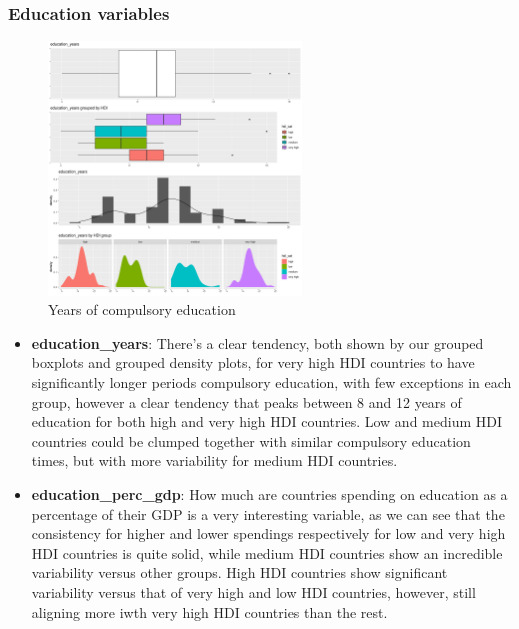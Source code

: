 \documentclass[]{article}
\providecommand{\tightlist}{%
  \setlength{\itemsep}{0pt}\setlength{\parskip}{0pt}}
\begin{document}
\hypertarget{education-variables}{%
\subsubsection{Education variables}\label{education-variables}}

\begin{figure}
\centering
\includegraphics[width=0.6\textwidth,height=\textheight]{./img/education_years.png}
\caption{Years of compulsory education}
\end{figure}

\begin{itemize}
\tightlist
\item
  \textbf{education\_years}: There's a clear tendency, both shown by our
  grouped boxplots and grouped density plots, for very high HDI
  countries to have significantly longer periods compulsory education,
  with few exceptions in each group, however a clear tendency that peaks
  between 8 and 12 years of education for both high and very high HDI
  countries. Low and medium HDI countries could be clumped together with
  similar compulsory education times, but with more variability for
  medium HDI countries.
\item
  \textbf{education\_perc\_gdp}: How much are countries spending on
  education as a percentage of their GDP is a very interesting variable,
  as we can see that the consistency for higher and lower spendings
  respectively for low and very high HDI countries is quite solid, while
  medium HDI countries show an incredible variability versus other
  groups. High HDI countries show significant variability versus that of
  very high and low HDI countries, however, still aligning more iwth
  very high HDI countries than the rest.
\end{itemize}
\end{document}
